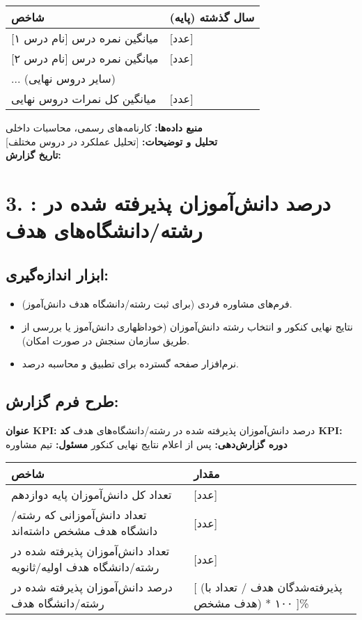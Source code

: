 \documentclass[11pt]{article}
\begin{document}
\bigskip
\begin{tabular}{ll}
\textbf{شاخص} & \textbf{سال گذشته (پایه)} \\
\hline
میانگین نمره درس {[نام درس ۱]} & {[عدد]} \\
میانگین نمره درس {[نام درس ۲]} & {[عدد]} \\
... (سایر دروس نهایی) &  \\
میانگین کل نمرات دروس نهایی & {[عدد]} \\
\end{tabular}
\bigskip

\noindent\textbf{منبع داده‌ها:} کارنامه‌های رسمی، محاسبات داخلی \\
\noindent\textbf{تحلیل و توضیحات:} {[تحلیل عملکرد در دروس مختلف]} \\
\noindent\textbf{تاریخ گزارش:} \\

\hrulefill
\bigskip
\newpage
\section*{3. : درصد دانش‌آموزان پذیرفته شده در رشته/دانشگاه‌های هدف}

\subsection*{ابزار اندازه‌گیری:}
\begin{itemize}
    \item فرم‌های مشاوره فردی (برای ثبت رشته/دانشگاه هدف دانش‌آموز).
    \item نتایج نهایی کنکور و انتخاب رشته دانش‌آموزان (خوداظهاری دانش‌آموز یا بررسی از طریق سازمان سنجش در صورت امکان).
    \item نرم‌افزار صفحه گسترده برای تطبیق و محاسبه درصد.
\end{itemize}

\subsection*{طرح فرم گزارش:}
\noindent\textbf{عنوان KPI:} درصد دانش‌آموزان پذیرفته شده در رشته/دانشگاه‌های هدف \hfill \textbf{کد KPI:}  \\
\noindent\textbf{دوره گزارش‌دهی:} پس از اعلام نتایج نهایی کنکور \hfill \textbf{مسئول:} تیم مشاوره \\

\bigskip
\begin{tabular}{ll}
\textbf{شاخص} & \textbf{مقدار} \\
\hline
تعداد کل دانش‌آموزان پایه دوازدهم & {[عدد]} \\
تعداد دانش‌آموزانی که رشته/دانشگاه هدف مشخص داشته‌اند & {[عدد]} \\
تعداد دانش‌آموزان پذیرفته شده در رشته/دانشگاه هدف اولیه/ثانویه & {[عدد]} \\
درصد دانش‌آموزان پذیرفته شده در رشته/دانشگاه هدف & {[ (پذیرفته‌شدگان هدف / تعداد با هدف مشخص) * ۱۰۰ ]\%} \\
\end{tabular}
\bigskip
\end{document}
